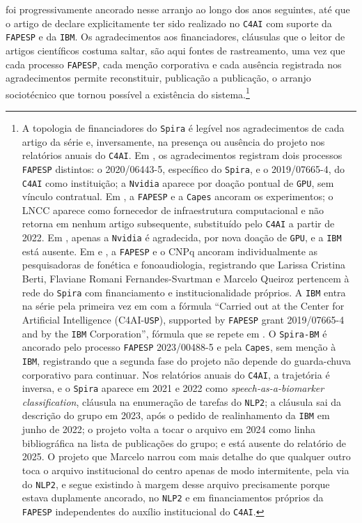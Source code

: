 foi progressivamente ancorado nesse arranjo ao longo dos anos seguintes, até que o artigo de \textcite{Gauy2025Contrasting} declare explicitamente ter sido realizado no \texttt{C4AI} com suporte da \texttt{FAPESP} e da \texttt{IBM}. Os agradecimentos aos financiadores, cláusulas que o leitor de artigos científicos costuma saltar, são aqui fontes de rastreamento, uma vez que cada processo \texttt{FAPESP}, cada menção corporativa e cada ausência registrada nos agradecimentos permite reconstituir, publicação a publicação, o arranjo sociotécnico que tornou possível a existência do sistema.\footnote{A topologia de financiadores do \texttt{Spira} é legível nos agradecimentos de cada artigo da série e, inversamente, na presença ou ausência do projeto nos relatórios anuais do \texttt{C4AI}. Em \textcite{Casanova2021DeepLearning}, os agradecimentos registram dois processos \texttt{FAPESP} distintos: o 2020/06443-5, específico do \texttt{Spira}, e o 2019/07665-4, do \texttt{C4AI} como instituição; a \texttt{Nvidia} aparece por doação pontual de \texttt{GPU}, sem vínculo contratual. Em \textcite{Gauy2021MFCC}, a \texttt{FAPESP} e a \texttt{Capes} ancoram os experimentos; o LNCC aparece como fornecedor de infraestrutura computacional e não retorna em nenhum artigo subsequente, substituído pelo \texttt{C4AI} a partir de 2022. Em \textcite{Silva2022Interpretability}, apenas a \texttt{Nvidia} é agradecida, por nova doação de \texttt{GPU}, e a \texttt{IBM} está ausente. Em \textcite{Berti2023Frequency} e \textcite{Berti2025Healthcare}, a \texttt{FAPESP} e o CNPq ancoram individualmente as pesquisadoras de fonética e fonoaudiologia, registrando que Larissa Cristina Berti, Flaviane Romani Fernandes-Svartman e Marcelo Queiroz pertencem à rede do \texttt{Spira} com financiamento e institucionalidade próprios. A \texttt{IBM} entra na série pela primeira vez em \textcite{Gauy2024Discriminant} com a fórmula \enquote{Carried out at the Center for Artificial Intelligence (C4AI-\texttt{USP}), supported by \texttt{FAPESP} grant 2019/07665-4 and by the \texttt{IBM} Corporation}, fórmula que se repete em \textcite{Gauy2025Contrasting}. O \texttt{Spira-BM} \parencite{Finger2025SPIRABM} é ancorado pelo processo \texttt{FAPESP} 2023/00488-5 e pela \texttt{Capes}, sem menção à \texttt{IBM}, registrando que a segunda fase do projeto não depende do guarda-chuva corporativo para continuar. Nos relatórios anuais do \texttt{C4AI}, a trajetória é inversa, e o \texttt{Spira} aparece em 2021 e 2022 como \textit{speech-as-a-biomarker classification}, cláusula na enumeração de tarefas do \texttt{NLP2}; a cláusula sai da descrição do grupo em 2023, após o pedido de realinhamento da \texttt{IBM} em junho de 2022; o projeto volta a tocar o arquivo em 2024 como linha bibliográfica na lista de publicações do grupo; e está ausente do relatório de 2025. O projeto que Marcelo narrou com mais detalhe do que qualquer outro toca o arquivo institucional do centro apenas de modo intermitente, pela via do \texttt{NLP2}, e segue existindo à margem desse arquivo precisamente porque estava duplamente ancorado, no \texttt{NLP2} e em financiamentos próprios da \texttt{FAPESP} independentes do auxílio institucional do \texttt{C4AI}.}


